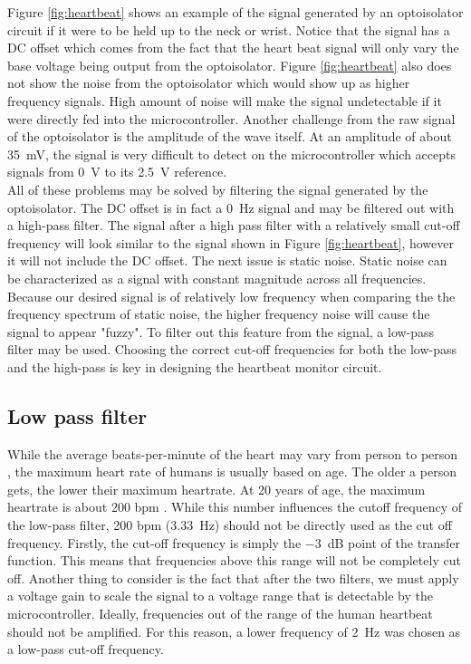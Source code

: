 \documentclass[CMPE]{../KGCOEReport}
\begin{document}
	Figure \ref{fig:heartbeat} shows an example of the signal generated by an optoisolator
	circuit if it were to be held up to the neck or wrist. Notice that the signal has a
	DC offset which comes from the fact that the heart beat signal will only vary the
	base voltage being output from the optoisolator. Figure \ref{fig:heartbeat} also
	does not show the noise from the optoisolator which would show up as higher frequency
	signals. High amount of noise will make the signal undetectable if it were directly
	fed into the microcontroller. Another challenge from the raw signal of the optoisolator
	is the amplitude of the wave itself. At an amplitude of about \SI{35}{\milli\volt},
	the signal is very difficult to detect on the microcontroller which accepts signals
	from \SI{0}{\volt} to its \SI{2.5}{\volt} reference. \\

	All of these problems may be solved by filtering the signal generated by the
	optoisolator. The DC offset is in fact a \SI{0}{\hertz} signal and may be filtered
	out with a high-pass filter. The signal after a high pass filter with a relatively
	small cut-off frequency will look similar to the signal shown in Figure 
	\ref{fig:heartbeat},
	however it will not include the DC offset. The next issue is static noise. Static noise
	can be characterized as a signal with constant magnitude across all frequencies.
	Because our desired signal is of relatively low frequency when comparing the the
	frequency spectrum of static noise, the higher frequency noise will cause the signal
	to appear "fuzzy". To
	filter out this feature from the signal, a low-pass filter may be used. Choosing the
	correct cut-off frequencies for both the low-pass and the high-pass is key in
	designing the heartbeat monitor circuit.

	\subsection*{Low pass filter}
	While the average beats-per-minute of the heart may vary from person to person
	\cite{b1}, the maximum heart rate of humans is usually based on age. The older a
	person gets, the lower their maximum heartrate. At 20 years of age, the maximum
	heartrate is about 200 bpm \cite{b2}. While this number influences the cutoff
	frequency of the low-pass filter, 200 bpm (\SI{3.33}{\hertz}) should not be directly
	used as the cut off frequency. Firstly, the cut-off frequency is simply the
	\SI{-3}{\dB} point of the transfer function. This means that frequencies above this
	range will not be completely cut off. Another thing to consider is the fact that
	after the two filters, we must apply a voltage gain to scale the signal to a voltage
	range that is detectable by the microcontroller. Ideally, frequencies out of the
	range of the human heartbeat should not be amplified. For this reason, a lower
	frequency of \SI{2}{\hertz} was chosen as a low-pass cut-off frequency.
\end{document}
